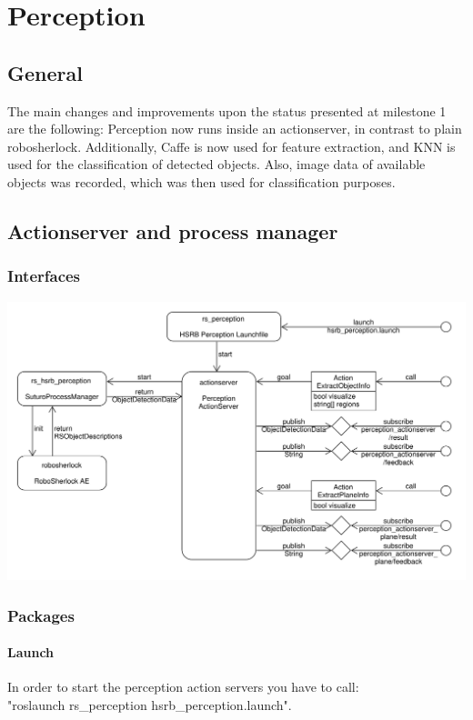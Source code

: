 \documentclass[main.tex]{subfiles}
\begin{document}
	\chapter{Perception}

		\section{General}
		The main changes and improvements upon the status presented at milestone 1 are the following: Perception now runs inside an actionserver, in contrast to 				plain robosherlock. Additionally, Caffe is now used for feature extraction, and KNN is used for the classification of detected objects. Also, image data of 		available objects was recorded, which was then used for classification purposes.

		\section{Actionserver and process manager}
			\subsection{Interfaces}
			\includegraphics[width=\textwidth]{../architecture/perception_architecture/perception.pdf}

			\subsection{Packages}
			\subsubsection{Launch}
			In order to start the perception action servers you have to call:\\
			"roslaunch rs\_perception hsrb\_perception.launch".
\end{document}
